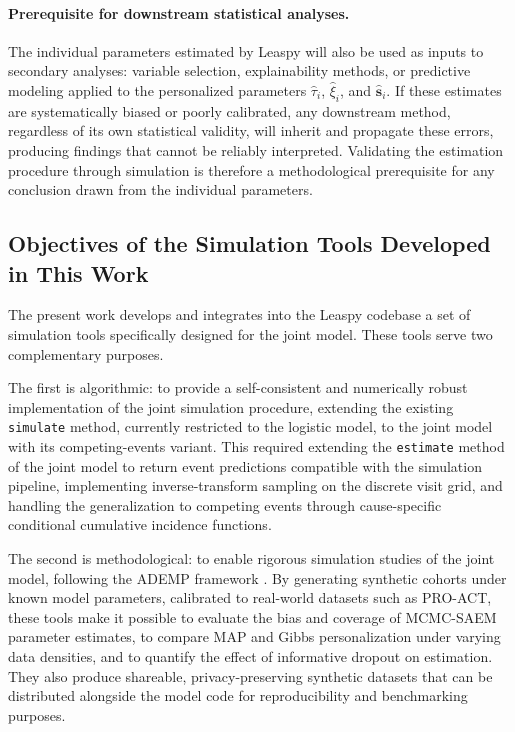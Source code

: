 \documentclass{rapportCS}
\begin{document}
\paragraph{Prerequisite for downstream statistical analyses.}
The individual parameters estimated by Leaspy will also be used as inputs to secondary analyses: variable selection, explainability methods, or predictive modeling applied to the personalized parameters $\hat{\tau}_i$, $\hat{\xi}_i$, and $\hat{\mathbf{s}}_i$. If these estimates are systematically biased or poorly calibrated, any downstream method, regardless of its own statistical validity, will inherit and propagate these errors, producing findings that cannot be reliably interpreted. Validating the estimation procedure through simulation is therefore a methodological prerequisite for any conclusion drawn from the individual parameters.

\subsection{Objectives of the Simulation Tools Developed in This Work}

The present work develops and integrates into the Leaspy codebase a set of simulation tools specifically designed for the joint model. These tools serve two complementary purposes.

The first is algorithmic: to provide a self-consistent and numerically robust implementation of the joint simulation procedure, extending the existing \texttt{simulate} method, currently restricted to the logistic model, to the joint model with its competing-events variant. This required extending the \texttt{estimate} method of the joint model to return event predictions compatible with the simulation pipeline, implementing inverse-transform sampling on the discrete visit grid, and handling the generalization to competing events through cause-specific conditional cumulative incidence functions.

The second is methodological: to enable rigorous simulation studies of the joint model, following the ADEMP framework \cite{morris2019using}. By generating synthetic cohorts under known model parameters, calibrated to real-world datasets such as PRO-ACT, these tools make it possible to evaluate the bias and coverage of MCMC-SAEM parameter estimates, to compare MAP and Gibbs personalization under varying data densities, and to quantify the effect of informative dropout on estimation. They also produce shareable, privacy-preserving synthetic datasets that can be distributed alongside the model code for reproducibility and benchmarking purposes.
\end{document}
